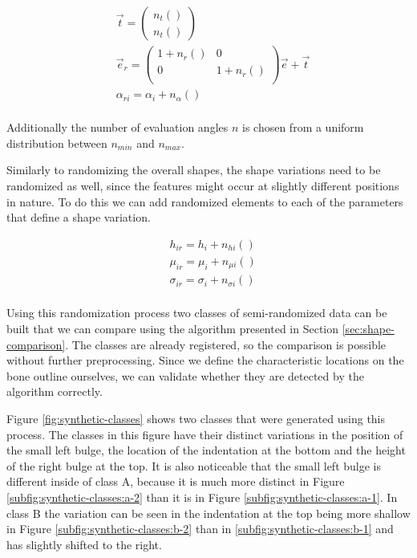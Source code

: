 \documentclass[pdftex,12pt,a4paper]{report}
\begin{document}
\begin{equation}
	\begin{split}
		& \vec{t} = \left( \begin{array}{c}
			n_t() \\
			n_t()
		\end{array} \right) \\
		& \vec{e}_r = \begin{pmatrix}
			1 + n_r() & 0 \\
			0 & 1 + n_r() \\
		\end{pmatrix} \vec{e}  + \vec{t} \\
		& \alpha_{ri} = \alpha_i + n_\alpha() \\
	\end{split}
\end{equation}

Additionally the number of evaluation angles $n$ is chosen from a uniform distribution between $n_{min}$ and $n_{max}$.

Similarly to randomizing the overall shapes, the shape variations need to be randomized as well, since the features might occur at slightly different positions in nature. To do this we can add randomized elements to each of the parameters that define a shape variation.

\begin{equation}
	\begin{split}
		& h_{ir} = h_i + n_{hi}() \\
		& \mu_{ir} = \mu_i + n_{\mu i}() \\
		& \sigma_{ir} = \sigma_i + n_{\sigma i}() \\
	\end{split}
\end{equation}

Using this randomization process two classes of semi-randomized data can be built that we can compare using the algorithm presented in Section \ref{sec:shape-comparison}. The classes are already registered, so the comparison is possible without further preprocessing. Since we define the characteristic locations on the bone outline ourselves, we can validate whether they are detected by the algorithm correctly.

Figure \ref{fig:synthetic-classes} shows two classes that were generated using this process. The classes in this figure have their distinct variations in the position of the small left bulge, the location of the indentation at the bottom and the height of the right bulge at the top. It is also noticeable that the small left bulge is different inside of class A, because it is much more distinct in Figure \ref{subfig:synthetic-classes:a-2} than it is in Figure \ref{subfig:synthetic-classes:a-1}. In class B the variation can be seen in the indentation at the top being more shallow in Figure \ref{subfig:synthetic-classes:b-2} than in \ref{subfig:synthetic-classes:b-1} and has slightly shifted to the right.
\end{document}
